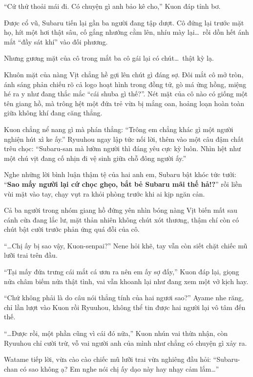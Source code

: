 \documentclass[../main.tex]{subfiles}
\begin{document}
``Cứ thử thoải mái đi. Có chuyện gì anh bảo kê cho,'' Kuon đáp tỉnh bơ.


Được cổ vũ, Subaru tiến lại gần ba người đang tập dượt. Cô đứng lại trước mặt họ, hít một hơi thật sâu, cố gắng nhướng cằm lên, nhíu mày lại\dots\ rồi dồn hết ánh mắt ``đầy sát khí'' vào đối phương.

Nhưng gương mặt của cô trong mắt ba cô gái lại có chút\dots\ thật kỳ lạ.

Khuôn mặt của nàng Vịt chẳng hề gợi lên chút gì đáng sợ. Đôi mắt cô mở tròn, ánh sáng phản chiếu rõ cả logo hoạt hình trong đồng tử, gò má ửng hồng, miệng hé ra y như đang thắc mắc ``cái shuba gì thế?''. Nét mặt của cô nào có giống một tên giang hồ, mà trông hệt một đứa trẻ vừa bị mắng oan, hoảng loạn hoàn toàn giữa không khí đang căng thẳng.


Kuon chẳng nể nang gì mà phán thẳng: ``Trông em chẳng khác gì một người nghiện hút xì ke ấy.'' Ryuuhou ngay lập tức nối lời, thêm vào một câu đậm chất trêu chọc: ``Subaru-san mà lườm người thì đáng yêu cực kỳ luôn. Nhìn hệt như một chú vịt đang cố nhịn đi vệ sinh giữa chỗ đông người ấy.''

Nghe những lời bình luận thậm tệ của hai anh em, Subaru bật khóc tức tưởi: ``\textbf{Sao mấy người lại cứ chọc ghẹo, bắt bẻ Subaru mãi thế hả!?}'' rồi liền vùi mặt vào tay, chạy vụt ra khỏi phòng trước khi ai kịp ngăn cản.

Cả ba người trong nhóm giang hồ đứng yên nhìn bóng nàng Vịt biến mất sau cánh cửa đang lắc lư, mặt thản nhiên không chút xót thương, thậm chí còn có chút bật cười trước phản ứng quá đỗi của cô.

``\dots Chị ấy bị sao vậy, Kuon-senpai?'' Nene hỏi khẽ, tay vẫn còn siết chặt chiếc mũ lưỡi trai trên đầu.

``Tại mấy đứa trưng cái mắt cá ươn ra nên em ấy sợ đấy,'' Kuon đáp lại, giọng nửa châm biếm nửa thật tình, vai vẫn khoanh lại như đang xem một vở kịch hay.

``Chứ không phải là do câu nói thẳng tính của hai ngươi sao?'' Ayame nhe răng, chỉ lần lượt vào Kuon rồi Ryuuhou, không thể tin được hai người lại vô tâm đến thế.

``\dots Được rồi, một phần cũng vì cái đó nữa,'' Kuon nhún vai thừa nhận, còn Ryuuhou chỉ cười trừ, vỗ vai người anh của mình như chẳng có chuyện gì xảy ra.

Watame tiếp lời, vừa cào cào chiếc mũ lưỡi trai vừa nghiêng đầu hỏi: ``Subaru-chan có sao không ạ? Em nghe nói chị ấy dạo này hay nhạy cảm lắm\dots''
\end{document}
